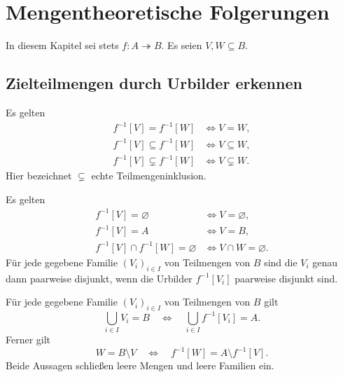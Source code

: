 \chapter{Mengentheoretische Folgerungen}
\label{b07guide:ch:images}

In diesem Kapitel sei stets $f\colon A\twoheadrightarrow B$.
Es seien $V,W\subseteq B$.

\section{Zielteilmengen durch Urbilder erkennen}

\begin{theorem}
\label{b07guide:thm:reflection}
Es gelten
\[
 \begin{aligned}
 f^{-1}[V]=f^{-1}[W]&\Longleftrightarrow V=W,\\
 f^{-1}[V]\subseteq f^{-1}[W]&\Longleftrightarrow V\subseteq W,\\
 f^{-1}[V]\subsetneq f^{-1}[W]&\Longleftrightarrow V\subsetneq W.
 \end{aligned}
\]
Hier bezeichnet $\subsetneq$ echte Teilmengeninklusion.
\end{theorem}

\begin{theorem}
\label{b07guide:thm:tests}
Es gelten
\[
 \begin{aligned}
 f^{-1}[V]=\varnothing&\Longleftrightarrow V=\varnothing,\\
 f^{-1}[V]=A&\Longleftrightarrow V=B,\\
 f^{-1}[V]\cap f^{-1}[W]=\varnothing
       &\Longleftrightarrow V\cap W=\varnothing.
 \end{aligned}
\]
Für jede gegebene Familie $(V_i)_{i\in I}$ von Teilmengen von $B$
sind die $V_i$ genau dann paarweise disjunkt, wenn die Urbilder
$f^{-1}[V_i]$ paarweise disjunkt sind.
\end{theorem}

\begin{theorem}
\label{b07guide:thm:cover}
Für jede gegebene Familie $(V_i)_{i\in I}$ von Teilmengen von $B$ gilt
\[
 \bigcup_{i\in I}V_i=B
 \quad\Longleftrightarrow\quad
 \bigcup_{i\in I}f^{-1}[V_i]=A.
\]
Ferner gilt
\[
 W=B\setminus V
 \quad\Longleftrightarrow\quad
 f^{-1}[W]=A\setminus f^{-1}[V].
\]
Beide Aussagen schließen leere Mengen und leere Familien ein.
\end{theorem}

